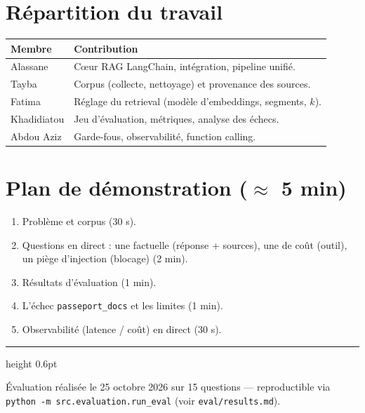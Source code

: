 \documentclass[11pt,a4paper]{article}
\begin{document}
\section{Répartition du travail}
\begin{tabularx}{\textwidth}{@{}l X@{}}
\toprule
\textbf{Membre} & \textbf{Contribution} \\
\midrule
Alassane & C\oe ur RAG LangChain, intégration, pipeline unifié. \\
Tayba & Corpus (collecte, nettoyage) et provenance des sources. \\
Fatima & Réglage du retrieval (modèle d'embeddings, segments, $k$). \\
Khadidiatou & Jeu d'évaluation, métriques, analyse des échecs. \\
Abdou Aziz & Garde-fous, observabilité, function calling. \\
\bottomrule
\end{tabularx}

\section{Plan de démonstration ($\approx$ 5 min)}
\begin{enumerate}
  \item Problème et corpus (30 s).
  \item Questions en direct : une factuelle (réponse + sources), une de coût (outil), un piège d'injection (blocage) (2 min).
  \item Résultats d'évaluation (1 min).
  \item L'échec \texttt{passeport\_docs} et les limites (1 min).
  \item Observabilité (latence / coût) en direct (30 s).
\end{enumerate}

\vfill
{\color{rulegray}\hrule height 0.6pt}
\vspace{3pt}
{\footnotesize\color{steel}Évaluation réalisée le 25 octobre 2026 sur 15 questions — reproductible via
\texttt{python -m src.evaluation.run\_eval} (voir \texttt{eval/results.md}).}
\end{document}
